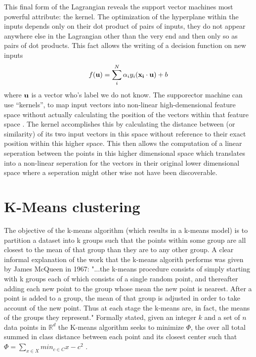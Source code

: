 This final form of the Lagrangian reveals the support vector machines most powerful attribute: the kernel.
The optimization of the hyperplane within the inputs depends only on their dot product of pairs of inputs,
they do not appear anywhere else in the Lagrangian other than the very end and then only so as pairs of dot products. This fact allows the writing of a decision function on new inputs $$f(\bold{u}) = \sum_{i}^{N}\alpha_{i}y_{i}(\bold{x_i}\cdot\bold{u})+b$$ where $\bold{u}$ is a vector who's label we do not know.
The supporector machine can use ``kernels'', to map input vectors into
non-linear high-demensional feature space without actually calculating the position of
the vectors within that feature space \cite{Vapnik}. The kernel accomplishes this by calculating the
distance between (or similarity) of its two input vectors in this space without reference to their exact
position within this higher space. This then allows the computation of a linear seperation between
the points in this higher dimensional space which translates into a non-linear seperation for the
vectors in their original lower dimensional space where a seperation might other wise not have been
discoverable.
\section{K-Means clustering}
The objective of the k-means algorithm (which results in a k-means model) is to partition
a dataset into k groups such that the points within some group are all closest to
the mean of that group than they are to any other group. A clear
informal explanation of the work that the k-means algorith performs
was given by James McQueen in 1967: "...the k-means procedure
consists of simply starting with k groups each of which consists of a
single random point, and thereafter adding each new point to the
group whose mean the new point is nearest. After a point is added to
a group, the mean of that group is adjusted in order to take account
of the new point. Thus at each stage the k-means are, in fact, the
means of the groups they represent." \cite{MacQueen} Formally stated,
given an integer $k$ and a set of $n$ data points in
$\mathbb{R}^{d}$ the K-means algorithm seeks to minimize  $\Phi$, the
over all total summed in class distance between each point and its
closest center such that $\mathbb \Phi = \sum_{x \in X} min_{c \in C}{x-c^{2}}$
\cite{Arthur}.

